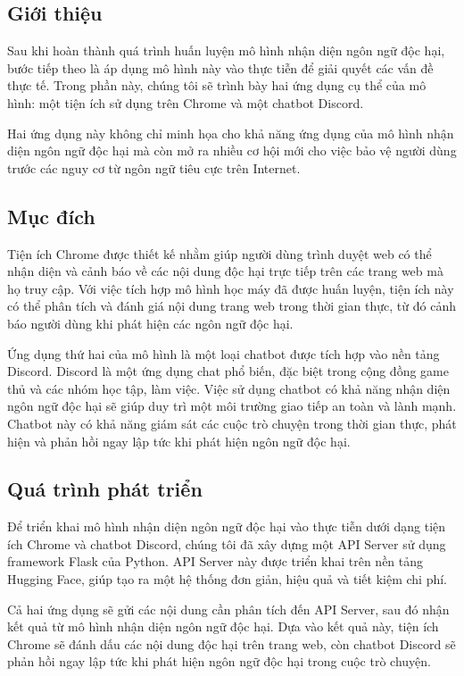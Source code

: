 \subsection{Giới thiệu}
Sau khi hoàn thành quá trình huấn luyện mô hình nhận diện ngôn ngữ độc hại, bước tiếp theo là áp dụng mô hình này vào thực tiễn để giải quyết các vấn đề thực tế. Trong phần này, chúng tôi sẽ trình bày hai ứng dụng cụ thể của mô hình: một tiện ích sử dụng trên Chrome và một chatbot Discord.

Hai ứng dụng này không chỉ minh họa cho khả năng ứng dụng của mô hình nhận diện ngôn ngữ độc hại mà còn mở ra nhiều cơ hội mới cho việc bảo vệ người dùng trước các nguy cơ từ ngôn ngữ tiêu cực trên Internet.

\subsection{Mục đích}

Tiện ích Chrome được thiết kế nhằm giúp người dùng trình duyệt web có thể nhận diện và cảnh báo về các nội dung độc hại trực tiếp trên các trang web mà họ truy cập. Với việc tích hợp mô hình học máy đã được huấn luyện, tiện ích này có thể phân tích và đánh giá nội dung trang web trong thời gian thực, từ đó cảnh báo người dùng khi phát hiện các ngôn ngữ độc hại.

Ứng dụng thứ hai của mô hình là một loại chatbot được tích hợp vào nền tảng Discord. Discord là một ứng dụng chat phổ biến, đặc biệt trong cộng đồng game thủ và các nhóm học tập, làm việc. Việc sử dụng chatbot có khả năng nhận diện ngôn ngữ độc hại sẽ giúp duy trì một môi trường giao tiếp an toàn và lành mạnh. Chatbot này có khả năng giám sát các cuộc trò chuyện trong thời gian thực, phát hiện và phản hồi ngay lập tức khi phát hiện ngôn ngữ độc hại.

\subsection{Quá trình phát triển}
Để triển khai mô hình nhận diện ngôn ngữ độc hại vào thực tiễn dưới dạng tiện ích Chrome và chatbot Discord, chúng tôi đã xây dựng một API Server sử dụng framework Flask của Python. API Server này được triển khai trên nền tảng Hugging Face, giúp tạo ra một hệ thống đơn giản, hiệu quả và tiết kiệm chi phí.

Cả hai ứng dụng sẽ gửi các nội dung cần phân tích đến API Server, sau đó nhận kết quả từ mô hình nhận diện ngôn ngữ độc hại. Dựa vào kết quả này, tiện ích Chrome sẽ đánh dấu các nội dung độc hại trên trang web, còn chatbot Discord sẽ phản hồi ngay lập tức khi phát hiện ngôn ngữ độc hại trong cuộc trò chuyện.

